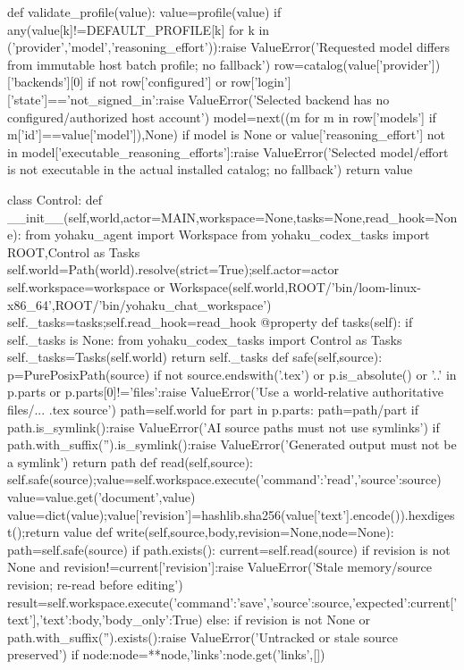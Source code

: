 def validate_profile(value):
 value=profile(value)
 if any(value[k]!=DEFAULT_PROFILE[k] for k in ('provider','model','reasoning_effort')):raise ValueError('Requested model differs from immutable host batch profile; no fallback')
 row=catalog(value['provider'])['backends'][0]
 if not row['configured'] or row['login']['state']=='not_signed_in':raise ValueError('Selected backend has no configured/authorized host account')
 model=next((m for m in row['models'] if m['id']==value['model']),None)
 if model is None or value['reasoning_effort'] not in model['executable_reasoning_efforts']:raise ValueError('Selected model/effort is not executable in the actual installed catalog; no fallback')
 return value

class Control:
 def __init__(self,world,actor=MAIN,workspace=None,tasks=None,read_hook=None):
  from yohaku_agent import Workspace
  from yohaku_codex_tasks import ROOT,Control as Tasks
  self.world=Path(world).resolve(strict=True);self.actor=actor
  self.workspace=workspace or Workspace(self.world,ROOT/'bin/loom-linux-x86_64',ROOT/'bin/yohaku_chat_workspace')
  self._tasks=tasks;self.read_hook=read_hook
 @property
 def tasks(self):
  if self._tasks is None:
   from yohaku_codex_tasks import Control as Tasks
   self._tasks=Tasks(self.world)
  return self._tasks
 def safe(self,source):
  p=PurePosixPath(source)
  if not source.endswith('.tex') or p.is_absolute() or '..' in p.parts or p.parts[0]!='files':raise ValueError('Use a world-relative authoritative files/... .tex source')
  path=self.world
  for part in p.parts:
   path=path/part
   if path.is_symlink():raise ValueError('AI source paths must not use symlinks')
  if path.with_suffix('').is_symlink():raise ValueError('Generated output must not be a symlink')
  return path
 def read(self,source):
  self.safe(source);value=self.workspace.execute({'command':'read','source':source})
  value=value.get('document',value)
  value=dict(value);value['revision']=hashlib.sha256(value['text'].encode()).hexdigest();return value
 def write(self,source,body,revision=None,node=None):
  path=self.safe(source)
  if path.exists():
   current=self.read(source)
   if revision is not None and revision!=current['revision']:raise ValueError('Stale memory/source revision; re-read before editing')
   result=self.workspace.execute({'command':'save','source':source,'expected':current['text'],'text':body,'body_only':True})
  else:
   if revision is not None or path.with_suffix('').exists():raise ValueError('Untracked or stale source preserved')
   if node:node={**node,'links':node.get('links',[])}
